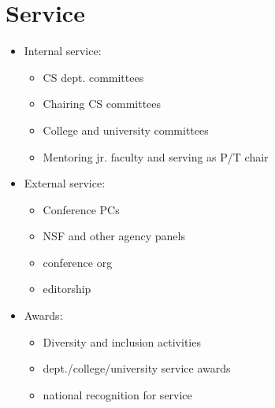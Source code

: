 \documentclass[11pt]{article}
\begin{document}
\section{Service}
\begin{itemize}
\item Internal service:
  \begin{itemize}
  \item CS dept. committees
  \item Chairing CS committees
  \item College and university committees
  \item Mentoring jr. faculty and serving as P/T chair
  \end{itemize}
\item External service:
  \begin{itemize}
  \item Conference PCs
  \item NSF and other agency panels
  \item conference org
  \item editorship
  \end{itemize}
\item Awards:
  \begin{itemize}
  \item Diversity and inclusion activities
  \item dept./college/university service awards
  \item national recognition for service
  \end{itemize}
\end{itemize}
\end{document}
